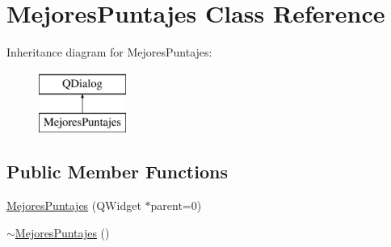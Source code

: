 \hypertarget{class_mejores_puntajes}{\section{Mejores\-Puntajes Class Reference}
\label{class_mejores_puntajes}
}
Inheritance diagram for Mejores\-Puntajes\-:\begin{figure}[H]
\begin{center}
\leavevmode
\includegraphics[height=2.000000cm]{class_mejores_puntajes}
\end{center}
\end{figure}
\subsection*{Public Member Functions}
\begin{DoxyCompactItemize}
\item 
\hyperlink{class_mejores_puntajes_a3069d608712a7c7e84df87471b0587bb}{Mejores\-Puntajes} (Q\-Widget $\ast$parent=0)
\item 
\hyperlink{class_mejores_puntajes_a240f173fb76c93d38027261a016244f1}{$\sim$\-Mejores\-Puntajes} ()
\end{DoxyCompactItemize}


